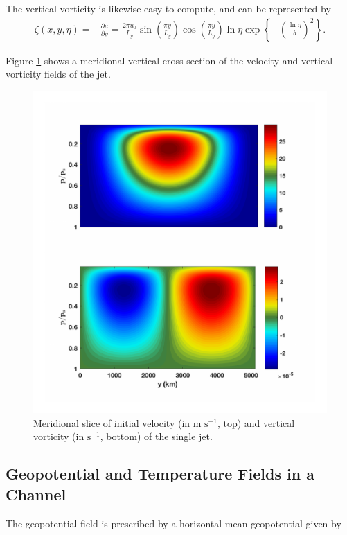 The vertical vorticity is likewise easy to compute, and can be represented by
\begin{align}
\zeta(x,y,\eta) = -\frac{\partial u}{\partial y} = \frac{2\pi u_0}{L_y} \sin{\left(\frac{\pi y}{L_y}\right)} \cos{\left(\frac{\pi y}{L_y}\right)} \ln{\eta} \exp{\left\{-\left(\frac{\ln \eta}{b}\right)^2\right\}}.
\end{align}

Figure \ref{fig:initialVelVort} shows a meridional-vertical cross section of the velocity and vertical vorticity fields of the jet.
\begin{figure}[H]
\includegraphics[scale=1]{Chapter3/img/initialVelVort}
\caption{Meridional slice of initial velocity (in m $\text{s}^{-1}$, top) and vertical vorticity (in $\text{s}^{-1}$, bottom) of the single jet.}
\label{fig:initialVelVort}
\end{figure}

\subsection{Geopotential and Temperature Fields in a Channel}

The geopotential field is prescribed by a horizontal-mean geopotential given by

